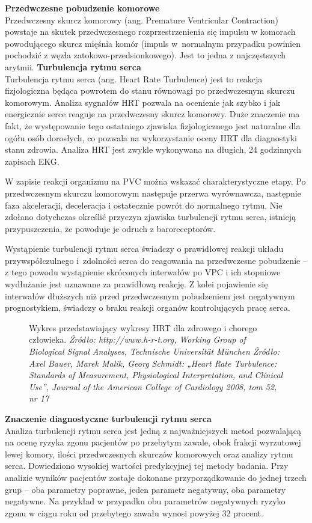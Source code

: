 \documentclass[a4paper, 11pt]{article}
\begin{document}
\textbf{Przedwczesne pobudzenie komorowe}\\
Przedwczesny skurcz komorowy (ang. Premature Ventricular
Contraction) powstaje na skutek przedwczesnego rozprzestrzenienia się
impulsu w komorach powodującego skurcz mięśnia komór (impuls w~normalnym przypadku powinien pochodzić z węzła zatokowo-przedsionkowego).
Jest to jedna z najczęstszych arytmii.
\textbf{Turbulencja rytmu serca}\\
Turbulencja rytmu serca (ang. Heart Rate Turbulence) jest to reakcja fizjologiczna będąca powrotem do stanu równowagi po przedwczesnym skurczu
komorowym. Analiza sygnałów HRT pozwala na ocenienie jak
szybko i jak energicznie serce reaguje na przedwczesny skurcz
komorowy. Duże znaczenie ma fakt, że występowanie tego
ostatniego zjawiska fizjologicznego jest naturalne dla ogółu osób
dorosłych, co pozwala na wykorzystanie oceny HRT dla
diagnostyki stanu zdrowia. Analiza HRT jest zwykle wykonywana
na długich, 24 godzinnych zapisach EKG.
\par W zapisie reakcji organizmu na PVC można wskazać charakterystyczne etapy. Po przedwczesnym skurczu komorowym następuje przerwa wyrównawcza, następnie faza akceleracji, deceleracja i ostatecznie powrót do normalnego rytmu.
Nie zdołano dotychczas określić przyczyn zjawiska turbulencji rytmu serca, istnieją przypuszczenia, że powoduje je odruch z baroreceptorów.
\par Wystąpienie turbulencji rytmu serca świadczy o prawidłowej reakcji 
układu przywspółczulnego i~zdolności serca do reagowania na przedwczesne pobudzenie -- z tego powodu wystąpienie skróconych interwałów po VPC i ich stopniowe wydłużanie jest uznawane za prawidłową reakcję. Z kolei pojawienie się interwałów dłuższych niż przed 
przedwczesnym pobudzeniem jest negatywnym prognostykiem, świadczy o braku
reakcji organów kontrolujących pracę serca.

\begin{figure}[h!]
\centering
\caption{Wykres przedstawiający wykresy HRT dla zdrowego i chorego człowieka. 
\textit{Źródło: http://www.h-r-t.org, Working Group of Biological Signal Analyses, Technische Universität München Źródło: Axel Bauer, Marek Malik, Georg Schmidt: „Heart Rate Turbulence: Standards of Measurement, Physiological Interpretation, and Clinical Use”, Journal of the American College of Cardiology 2008, tom 52, nr 17} }
\end{figure}

\textbf{Znaczenie diagnostyczne turbulencji rytmu serca}\\
Analiza turbulencji rytmu serca jest jedną z najważniejszych metod pozwalającą na ocenę ryzyka zgonu pacjentów po przebytym zawale, obok frakcji wyrzutowej lewej komory, ilości przedwczesnych skurczów komorowych oraz analizy rytmu serca. Dowiedziono wysokiej wartości predykcyjnej tej metody badania.
Przy analizie wyników pacjentów zostaje dokonane przyporządkowanie do jednej trzech grup -- oba parametry poprawne, jeden parametr negatywny, oba parametry negatywne.
Na przykład w przypadku obu parametrów negatywnych ryzyko zgonu w ciągu roku od przebytego zawału wynosi powyżej 32 procent.
\end{document}
